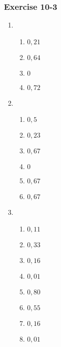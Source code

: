 {\begin{multicols}{3}
\subsubsection*{Exercise 10-3} %

\begin{enumerate}[noitemsep, label=\textbf{\arabic*}. ] 
\item %

    \begin{enumerate}[noitemsep, label=\textbf{(\alph*)} ]
	  \item $0,21$%
	  \item $0,64$%
	  \item $0$%
	  \item $0,72$%
    \end{enumerate}

\item %


      \begin{enumerate}[noitemsep, label=\textbf{(\alph*)} ]
	  \item $0,5$%
	  \item $0,23$%
	  \item $0,67$%
	  \item $0$%
	  \item $0,67$%
	  \item $0,67$%
      \end{enumerate}
\item
      \begin{enumerate}[noitemsep, label=\textbf{(\alph*)} ]
	  \item $0,11$%
	  \item $0,33$%
	  \item $0,16$%
	  \item $0,01$%
	  \item $0,80$%
	  \item $0,55$%
	  \item $0,16$%
	  \item $0,01$%
      \end{enumerate}


\end{enumerate}
\end{multicols}}
